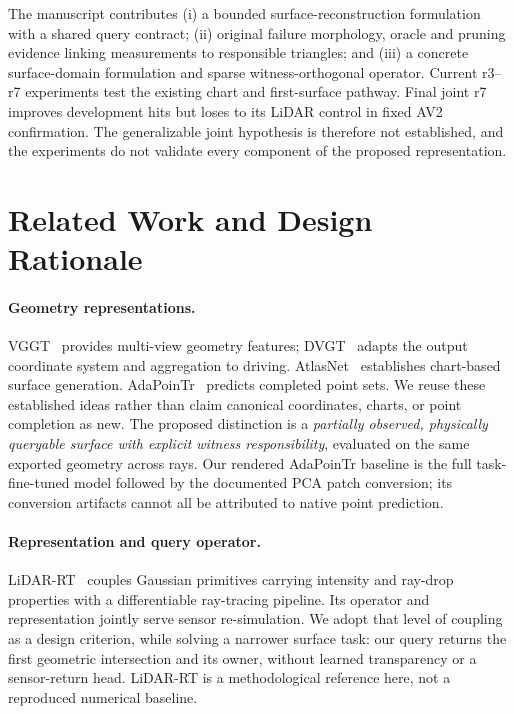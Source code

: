 The manuscript contributes (i) a bounded surface-reconstruction formulation with a shared query contract; (ii) original failure morphology, oracle and pruning evidence linking measurements to responsible triangles; and (iii) a concrete surface-domain formulation and sparse witness-orthogonal operator. Current r3--r7 experiments test the existing chart and first-surface pathway. Final joint r7 improves development hits but loses to its LiDAR control in fixed AV2 confirmation. The generalizable joint hypothesis is therefore not established, and the experiments do not validate every component of the proposed representation.

\section{Related Work and Design Rationale}
\paragraph{Geometry representations.}
VGGT~\cite{vggt} provides multi-view geometry features; DVGT~\cite{dvgt} adapts the output coordinate system and aggregation to driving. AtlasNet~\cite{atlasnet} establishes chart-based surface generation. AdaPoinTr~\cite{adapointr} predicts completed point sets. We reuse these established ideas rather than claim canonical coordinates, charts, or point completion as new. The proposed distinction is a \emph{partially observed, physically queryable surface with explicit witness responsibility}, evaluated on the same exported geometry across rays. Our rendered AdaPoinTr baseline is the full task-fine-tuned model followed by the documented PCA patch conversion; its conversion artifacts cannot all be attributed to native point prediction.

\paragraph{Representation and query operator.}
LiDAR-RT~\cite{lidarrt} couples Gaussian primitives carrying intensity and ray-drop properties with a differentiable ray-tracing pipeline. Its operator and representation jointly serve sensor re-simulation. We adopt that level of coupling as a design criterion, while solving a narrower surface task: our query returns the first geometric intersection and its owner, without learned transparency or a sensor-return head. LiDAR-RT is a methodological reference here, not a reproduced numerical baseline.

